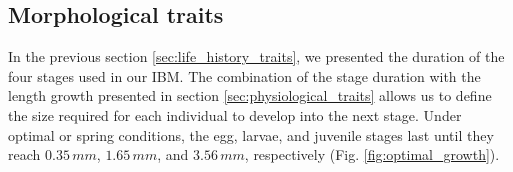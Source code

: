 


\subsection{Morphological traits}

In the previous section \ref{sec:life_history_traits}, we presented the duration of the four stages used in our IBM. The combination of the stage duration with the length growth presented in section \ref{sec:physiological_traits} allows us to define the size required for each individual to develop into the next stage. Under optimal or spring conditions, the egg, larvae, and juvenile stages last until they reach $0.35\,mm$, $1.65\, mm$, and $3.56\, mm$, respectively (Fig. \ref{fig:optimal_growth}). 

